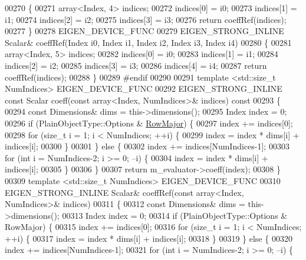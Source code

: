 \begin{DoxyCode}
00270     \{
00271       array<Index, 4> indices;
00272       indices[0] = i0;
00273       indices[1] = i1;
00274       indices[2] = i2;
00275       indices[3] = i3;
00276       \textcolor{keywordflow}{return} coeffRef(indices);
00277     \}
00278     EIGEN\_DEVICE\_FUNC
00279     EIGEN\_STRONG\_INLINE Scalar& coeffRef(Index i0, Index i1, Index i2, Index i3, Index i4)
00280     \{
00281       array<Index, 5> indices;
00282       indices[0] = i0;
00283       indices[1] = i1;
00284       indices[2] = i2;
00285       indices[3] = i3;
00286       indices[4] = i4;
00287       \textcolor{keywordflow}{return} coeffRef(indices);
00288     \}
00289 \textcolor{preprocessor}{#endif}
00290 
00291     \textcolor{keyword}{template} <std::\textcolor{keywordtype}{size\_t} NumIndices> EIGEN\_DEVICE\_FUNC
00292     EIGEN\_STRONG\_INLINE \textcolor{keyword}{const} Scalar coeff(\textcolor{keyword}{const} array<Index, NumIndices>& indices)\textcolor{keyword}{ const}
00293 \textcolor{keyword}{    }\{
00294       \textcolor{keyword}{const} Dimensions& dims = this->dimensions();
00295       Index index = 0;
00296       \textcolor{keywordflow}{if} (PlainObjectType::Options & \hyperlink{group__enums_ggaacded1a18ae58b0f554751f6cdf9eb13acfcde9cd8677c5f7caf6bd603666aae3}{RowMajor}) \{
00297         index += indices[0];
00298         \textcolor{keywordflow}{for} (\textcolor{keywordtype}{size\_t} i = 1; i < NumIndices; ++i) \{
00299           index = index * dims[i] + indices[i];
00300         \}
00301       \} \textcolor{keywordflow}{else} \{
00302         index += indices[NumIndices-1];
00303         \textcolor{keywordflow}{for} (\textcolor{keywordtype}{int} i = NumIndices-2; i >= 0; --i) \{
00304           index = index * dims[i] + indices[i];
00305         \}
00306       \}
00307       \textcolor{keywordflow}{return} m\_evaluator->coeff(index);
00308     \}
00309     \textcolor{keyword}{template} <std::\textcolor{keywordtype}{size\_t} NumIndices> EIGEN\_DEVICE\_FUNC
00310     EIGEN\_STRONG\_INLINE Scalar& coeffRef(\textcolor{keyword}{const} array<Index, NumIndices>& indices)
00311     \{
00312       \textcolor{keyword}{const} Dimensions& dims = this->dimensions();
00313       Index index = 0;
00314       \textcolor{keywordflow}{if} (PlainObjectType::Options & RowMajor) \{
00315         index += indices[0];
00316         \textcolor{keywordflow}{for} (\textcolor{keywordtype}{size\_t} i = 1; i < NumIndices; ++i) \{
00317           index = index * dims[i] + indices[i];
00318         \}
00319       \} \textcolor{keywordflow}{else} \{
00320         index += indices[NumIndices-1];
00321         \textcolor{keywordflow}{for} (\textcolor{keywordtype}{int} i = NumIndices-2; i >= 0; --i) \{

\end{DoxyCode}
